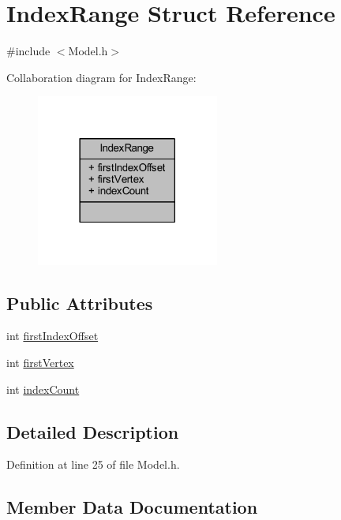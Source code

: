 \hypertarget{struct_index_range}{}\section{Index\+Range Struct Reference}
\label{struct_index_range}


{\ttfamily \#include $<$Model.\+h$>$}



Collaboration diagram for Index\+Range\+:\nopagebreak
\begin{figure}[H]
\begin{center}
\leavevmode
\includegraphics[width=170pt]{struct_index_range__coll__graph}
\end{center}
\end{figure}
\subsection*{Public Attributes}
\begin{DoxyCompactItemize}
\item 
int \hyperlink{struct_index_range_a0e0e760f6a861003bf6be8466671e1b5}{first\+Index\+Offset}
\item 
int \hyperlink{struct_index_range_a2e9aff1a8e3762185aada41ff99c5cfc}{first\+Vertex}
\item 
int \hyperlink{struct_index_range_ab1928b14e6f6877973fa6679257385bb}{index\+Count}
\end{DoxyCompactItemize}


\subsection{Detailed Description}


Definition at line 25 of file Model.\+h.



\subsection{Member Data Documentation}
